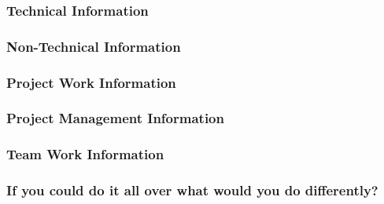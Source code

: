 \subsubsection{Technical Information}
\subsubsection{Non-Technical Information}
\subsubsection{Project Work Information}
\subsubsection{Project Management Information}
\subsubsection{Team Work Information}
\subsubsection{If you could do it all over what would you do differently?}
